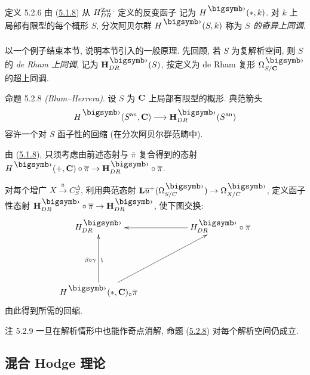 \begin{enonce*}{定义 5.2.6}
由 (\hyperref[Vbis.prop5.1.8]{5.1.8}) 从 $H^{\operatorname{Zar}.}_{DR}$ 定义的反变函子
记为 $H^{\bigdot} (\ast, k)$.
对 $k$ 上局部有限型的每个概形 $S$,
分次阿贝尔群 $H^{\bigdot}(S, k)$ 称为 \emph{$S$ 的奇异上同调}.
\end{enonce*}

\setcounter{subsubsection}{6}
\subsubsection{}
以一个例子结束本节, 说明本节引入的一般原理.
先回顾, 若 $S$ 为复解析空间, 则 $S$ 的 \emph{de Rham 上同调},
记为 $\HH^{\bigdot}_{DR}(S)$,
按定义为 de Rham 复形 $\Omega^{\bigdot}_{S / \CC}$ 的超上同调.

\begin{enonce*}{命题 5.2.8}
\emph{(Blum--Herrera)}.\pageoriginale{} 设 $S$ 为 $\mathbf{C}$ 上局部有限型的概形.
典范箭头
$$
H^{\bigdot} (S^{\an}, \CC) \longrightarrow
\HH^{\bigdot}_{DR}(S^{\an})
$$
容许一个对 $S$ 函子性的回缩 (在分次阿贝尔群范畴中).
\end{enonce*}

由 (\hyperref[Vbis.prop5.1.8]{5.1.8}),
只须考虑由前述态射与 $\bar{\pi}$ 复合得到的态射
$H^{\bigdot}(+, \CC) \circ \bar{\pi} \to\HH^{\bigdot}_{DR} \circ \bar{\pi}$.

对每个增广 $X \xrightarrow{u} C^{\Delta}_S$, 利用典范态射
$\LL \bar{u}^{+}(\Omega^{\bigdot}_{S/C}) \to\Omega^{\bigdot}_{X/C}$,
定义函子性态射 $\HH^{\bigdot}_{DR} \circ \bar{\pi} \to \HH^{\bigdot}_{DR}$,
使下图交换:
\[
\xymatrix@=2cm{
H^{\bigdot}_{DR}  & H^{\bigdot}_{DR} \circ \bar{\pi} \ar[l]\\
H^{\bigdot}(\ast,\CC)_{\circ}\bar{\pi}
\ar[u]_{\text{\rotatebox{90}{$\backsim$}}}^{\beta \circ \gamma}
\ar[ru]&
}
\]
由此得到所需的回缩.

\begin{enonce*}[remark]{注 5.2.9}
一旦在解析情形中也能作奇点消解,
命题 (\hyperref[Vbis.prop5.2.8]{5.2.8}) 对每个解析空间仍成立.
\end{enonce*}




\subsection{混合 Hodge 理论}

